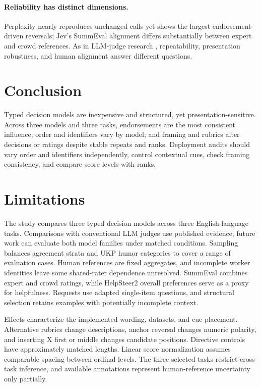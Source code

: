 \documentclass[11pt]{article}
\begin{document}
\paragraph{Reliability has distinct dimensions.}
Perplexity nearly reproduces unchanged calls yet shows the largest endorsement-driven reversals; Jev's SummEval alignment differs substantially between expert and crowd references. As in LLM-judge research \citep{shi-etal-2025-judging,bavaresco-etal-2025-llms}, repeatability, presentation robustness, and human alignment answer different questions.

\section{Conclusion}
Typed decision models are inexpensive and structured, yet presentation-sensitive. Across three models and three tasks, endorsements are the most consistent influence; order and identifiers vary by model; and framing and rubrics alter decisions or ratings despite stable repeats and ranks. Deployment audits should vary order and identifiers independently, control contextual cues, check framing consistency, and compare score levels with ranks.

\label{sec:main_end}

\section*{Limitations}
The study compares three typed decision models across three English-language tasks. Comparisons with conventional LLM judges use published evidence; future work can evaluate both model families under matched conditions. Sampling balances agreement strata and UKP humor categories to cover a range of evaluation cases. Human references are fixed aggregates, and incomplete worker identities leave some shared-rater dependence unresolved. SummEval combines expert and crowd ratings, while HelpSteer2 overall preferences serve as a proxy for helpfulness. Requests use adapted single-item questions, and structural selection retains examples with potentially incomplete context.

Effects characterize the implemented wording, datasets, and cue placement. Alternative rubrics change descriptions, anchor reversal changes numeric polarity, and inserting X first or middle changes candidate positions. Directive controls have approximately matched lengths. Linear score normalization assumes comparable spacing between ordinal levels. The three selected tasks restrict cross-task inference, and available annotations represent human-reference uncertainty only partially.
\end{document}
